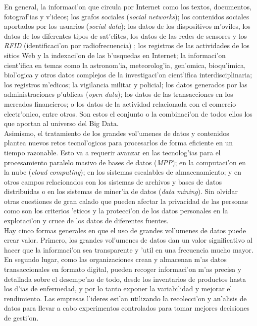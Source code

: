 En general, la informaci'on que circula por Internet como los textos, documentos,  fotograf'ias y v'ideos; los grafos sociales (\emph{social networks}); los contenidos sociales aportados por los usuarios (\emph{social data}); los datos de los dispositivos m'oviles, los datos de los diferentes tipos de sat'elites, los datos de las redes de sensores y los \emph{RFID} (identificaci'on por radiofrecuencia) \cite{brynjolfsson_big_2011}; los registros de las actividades de los sitios Web y  la indexaci'on de las b'usquedas en Internet; la informaci'on cient'ifica en temas como la astronom'ia, meteorolog'ia, gen'omica, bioqu'imica, biol'ogica y otros datos complejos de la investigaci'on cient'ifica interdisciplinaria; los registros m'edicos; la vigilancia militar y policial; los datos generados por las administraciones p'ublicas (\emph{open data}); los datos de las transacciones en los mercados financieros; o los datos de la actividad relacionada con el comercio electr'onico, entre otros. Son estos el conjunto o la combinaci'on de todos ellos los que aportan al universo del Big Data.\\

Asimismo, el tratamiento de los grandes vol'umenes de datos y contenidos plantea nuevos retos tecnol'ogicos para procesarlos de forma eficiente en un tiempo razonable. Esto va a requerir avanzar en las tecnolog'ias para el procesamiento paralelo masivo de bases de datos (\emph{MPP}); en la computaci'on en la nube (\emph{cloud computing}); en los sistemas escalables de almacenamiento; y en otros campos relacionados con los sistemas de archivos y bases de datos distribuidas o en los sistemas de miner'ia de datos (\emph{data mining}). Sin olvidar otras cuestiones de gran calado que pueden afectar la privacidad de las personas como son los criterios 'eticos y la protecci'on de los datos personales en la explotaci'on y cruce de los datos de diferentes fuentes.\\

Hay cinco formas generales en que el uso de grandes vol'umenes de datos puede crear valor. Primero, los grandes vol'umenes de datos dan un valor significativo al hacer que la informaci'on sea transparente y 'util en una frecuencia mucho mayor. En segundo lugar, como las organizaciones crean y almacenan m'as datos transaccionales en formato digital, pueden recoger informaci'on m'as precisa y detallada sobre el desempe'no de todo, desde los inventarios de productos hasta los d'ias de enfermedad, y por lo tanto exponer la variabilidad y mejorar el rendimiento. Las empresas l'ideres est'an utilizando la recolecci'on y an'alisis de datos para llevar a cabo experimentos controlados para tomar mejores decisiones de gesti'on. \\

